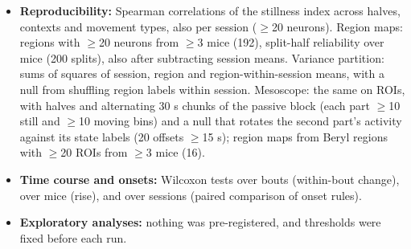 \documentclass[10pt,a4paper]{article}
\begin{document}
\begin{itemize}
\item \textbf{Reproducibility:} Spearman correlations of the stillness index across halves, contexts and movement types, also per session ($\geq$20 neurons). Region maps: regions with $\geq$20 neurons from $\geq$3 mice (192), split-half reliability over mice (200 splits), also after subtracting session means. Variance partition: sums of squares of session, region and region-within-session means, with a null from shuffling region labels within session. Mesoscope: the same on ROIs, with halves and alternating 30 s chunks of the passive block (each part $\geq$10 still and $\geq$10 moving bins) and a null that rotates the second part's activity against its state labels (20 offsets $\geq$15 s); region maps from Beryl regions with $\geq$20 ROIs from $\geq$3 mice (16).
\item \textbf{Time course and onsets:} Wilcoxon tests over bouts (within-bout change), over mice (rise), and over sessions (paired comparison of onset rules).
\item \textbf{Exploratory analyses:} nothing was pre-registered, and thresholds were fixed before each run.
\end{itemize}
\end{document}

